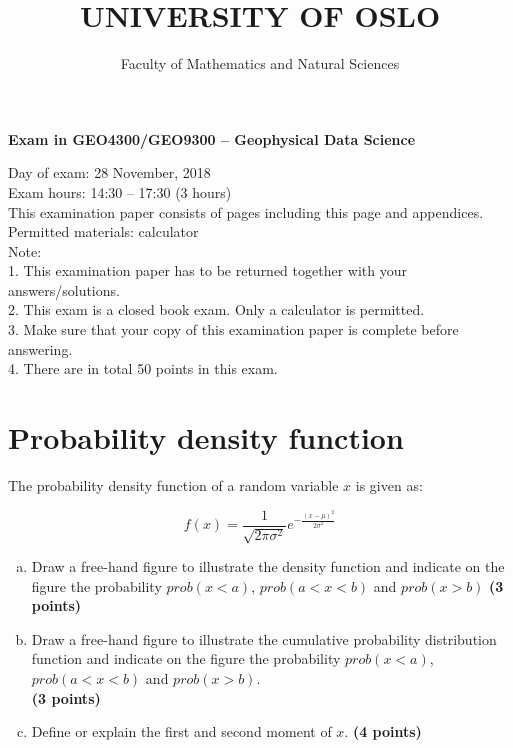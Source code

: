 \documentclass[12pt]{article}
\date{}
\begin{document}
\author{Faculty of Mathematics and Natural Sciences}

\title{UNIVERSITY OF OSLO}

\maketitle 
\begin{center}
\textbf{Exam in GEO4300/GEO9300 -- Geophysical Data Science}
\end{center}


Day of exam: 28 November, 2018 \\
Exam hours: 14:30 -- 17:30 (3 hours) \\ 

This examination paper consists of \pageref{LastPage} pages including this page and appendices. \\

Permitted materials: calculator\\ 

Note: \\
1. This examination paper has to be returned together with your answers/solutions.\\
2. This exam is a closed book exam. Only a calculator is permitted.\\ 
3. Make sure that your copy of this examination paper is complete before answering.\\ 
4. There are in total 50 points in this exam.\\


\pagebreak

\section{Probability density function}
The probability density function of a random variable $x$ is given as:

$$ f(x)=\frac{1}{\sqrt{2 \pi \sigma^2}} e^{- \frac{(x-\mu)^2}{2 \sigma^2}} $$

\begin{enumerate}[(a)] 
\item Draw a free-hand figure to illustrate the density function and indicate on the figure the probability $prob(x<a)$, $prob(a<x<b)$ and $prob(x>b)$ \textbf{\hfill (3 points)}
\item Draw a free-hand figure to illustrate the cumulative probability distribution function and indicate on the figure the probability $prob(x<a)$,  $prob(a<x<b)$ and $prob(x>b)$. \\ \textbf{\hfill (3 points)}
\item Define or explain the first and second moment of $x$. \textbf{\hfill (4 points)}
\end{enumerate}
\end{document}
